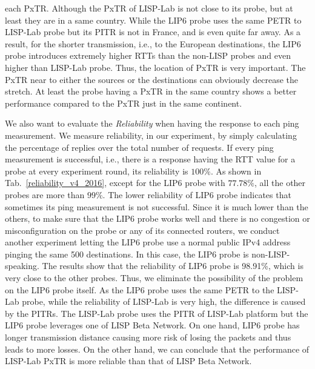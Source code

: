 each PxTR. Although the PxTR of LISP-Lab is not close to its probe, but at least they are in a same country. While the LIP6 probe uses the same PETR to LISP-Lab probe but its PITR is not in France, and is even quite far away. As a result, for the shorter transmission, i.e., to the European destinations, the LIP6 probe introduces extremely higher RTTs than the non-LISP probes and even higher than LISP-Lab probe. Thus, the location of PxTR is very important. The PxTR near to either the sources or the destinations can obviously decrease the stretch. At least the probe having a PxTR in the same country shows a better performance compared to the PxTR just in the same continent.

\begin{table}[!tb]
	\centering
	\caption{Reliability of each probe (IPv4) from Dataset 2016}
	\label{reliability_v4_2016}{
	}
\end{table}


We also want to evaluate the \emph{Reliability} when having the response to each ping measurement. We measure reliability, in our experiment, by simply calculating the percentage of replies over the total number of requests. If every ping measurement is successful, i.e., there is a response having the RTT value for a probe at every experiment round, its reliability is $100\%$. As shown in Tab.~\ref{reliability_v4_2016}, except for the LIP6 probe with $77.78\%$, all the other probes are more than $99\%$. The lower reliability of LIP6 probe indicates that sometimes its ping measurement is not successful. Since it is much lower than the others, to make sure that the LIP6 probe works well and there is no congestion or misconfiguration on the probe or any of its connected routers, we conduct another experiment letting the LIP6 probe use a normal public IPv4 address pinging the same 500 destinations. In this case, the LIP6 probe is non-LISP-speaking. The results show that the reliability of LIP6 probe is 98.91\%, which is very close to the other probes. Thus, we eliminate the possibility of the problem on the LIP6 probe itself. As the LIP6 probe uses the same PETR to the LISP-Lab probe, while the reliability of LISP-Lab is very high, the difference is caused by the PITRs. The LISP-Lab probe uses the PITR of LISP-Lab platform but the LIP6 probe leverages one of LISP Beta Network. On one hand, LIP6 probe has longer transmission distance causing more risk of losing the packets and thus leads to more losses. On the other hand, we can conclude that the performance of LISP-Lab PxTR is more reliable than that of LISP Beta Network.

